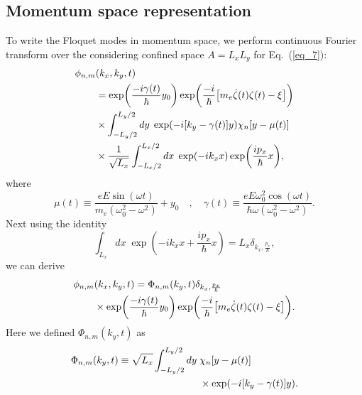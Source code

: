 \subsection{Momentum space representation}

To write the Floquet modes in momentum space, we perform continuous Fourier transform over the considering confined space $A=L_xL_y$ for Eq.~(\ref{eq_7}):
\begin{equation} \label{eq_b8}
  \begin{aligned}
    \phi_{n,m}&(k_x,k_y,t) \\
    & =
    \exp(
     \frac{-i\gamma(t)}{\hbar}
     y_0)
    \exp(\frac{-i}{\hbar}
    \qty[
    m_e \dot{\zeta}(t) \zeta(t) - \xi
    ])\\
    & \times
    \int_{-L_y/2}^{L_y/2} dy\; \exp(-i\qty[k_y - \gamma(t)]y)
    \chi_{n}\qty[y - \mu(t)] \\
     & \times
     \frac{1}{\sqrt{L_x}}
     \int_{-L_x/2}^{L_x/2} dx\;
     \exp(-ik_x x)
     \exp( \frac{i p_x }{\hbar}x ),
  \end{aligned}
\end{equation}
where
\begin{equation} \label{eq_b9}
  \mu(t) \equiv \frac{eE\sin(\omega t)}{m_e(\omega_0^2 - \omega^2)} + y_0
  \quad,\quad
  \gamma(t) \equiv
  \frac{eE\omega_0^2\cos(\omega t)}{\hbar\omega(\omega_0^2 - \omega^2)}.
\end{equation}
Next using the identity \cite{bruus04}
\begin{equation} \label{eq_b10}
  \int_{L_x} dx\;
  \exp( -ik_x x + \frac{i p_x }{\hbar}x ) =
  L_x \delta_{k_x,\frac{p_x}{\hbar}},
\end{equation}
we can derive
\begin{equation} \label{eq_b11}
  \begin{aligned}
    \phi_{n,m}&(k_x,k_y,t)  = 
    \Phi_{n,m}(k_y,t)
    \delta_{k_x,\frac{p_x}{\hbar}}\\
    & \times
    \exp(
     \frac{-i\gamma(t)}{\hbar}
     y_0)
    \exp(\frac{-i}{\hbar}
    \qty[
    m_e \dot{\zeta}(t) \zeta(t) - \xi
    ]).
  \end{aligned}
\end{equation}
Here we defined $\Phi_{n,m}(k_y,t)$ as
\begin{equation} \label{eq_b12}
  \begin{aligned}
    \Phi_{n,m}(k_y,t) \equiv
    \sqrt{L_x}
    \int_{-L_y/2}^{L_y/2} dy\; &
    \chi_{n}\qty[y - \mu(t)] \\
    & \times
    \exp(
      -i\qty[k_y - \gamma(t)]
      y).
  \end{aligned}
\end{equation}
